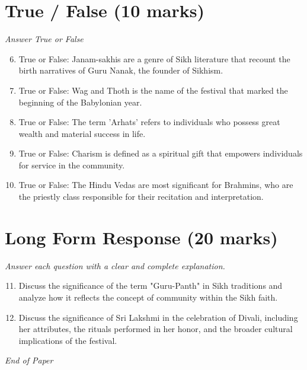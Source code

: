 \documentclass[12pt]{article}
\begin{document}
\section*{True / False (10 marks)}
\textit{Answer True or False}
\begin{enumerate}[label=\arabic*.]
\setcounter{enumi}{5}
\item True or False: Janam-sakhis are a genre of Sikh literature that recount the birth narratives of Guru Nanak, the founder of Sikhism.
\item True or False: Wag and Thoth is the name of the festival that marked the beginning of the Babylonian year.
\item True or False: The term 'Arhats' refers to individuals who possess great wealth and material success in life.
\item True or False: Charism is defined as a spiritual gift that empowers individuals for service in the community.
\item True or False: The Hindu Vedas are most significant for Brahmins, who are the priestly class responsible for their recitation and interpretation.
\end{enumerate}

\section*{Long Form Response (20 marks)}
\textit{Answer each question with a clear and complete explanation.}
\begin{enumerate}[label=\arabic*.]
\setcounter{enumi}{10}
\item Discuss the significance of the term "Guru-Panth" in Sikh traditions and analyze how it reflects the concept of community within the Sikh faith.
\item Discuss the significance of Sri Lakshmi in the celebration of Divali, including her attributes, the rituals performed in her honor, and the broader cultural implications of the festival.
\end{enumerate}

\vfill
\noindent\textit{End of Paper}
\end{document}

